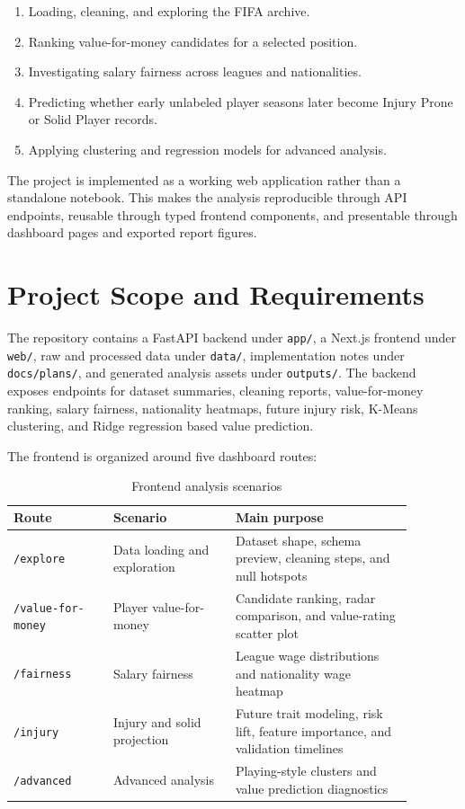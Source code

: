 \documentclass[11pt,a4paper]{article}
\begin{document}
\begin{enumerate}
  \item Loading, cleaning, and exploring the FIFA archive.
  \item Ranking value-for-money candidates for a selected position.
  \item Investigating salary fairness across leagues and nationalities.
  \item Predicting whether early unlabeled player seasons later become Injury Prone or Solid Player records.
  \item Applying clustering and regression models for advanced analysis.
\end{enumerate}

The project is implemented as a working web application rather than a standalone notebook. This makes the analysis reproducible through API endpoints, reusable through typed frontend components, and presentable through dashboard pages and exported report figures.

\section{Project Scope and Requirements}

The repository contains a FastAPI backend under \texttt{app/}, a Next.js frontend under \texttt{web/}, raw and processed data under \texttt{data/}, implementation notes under \texttt{docs/plans/}, and generated analysis assets under \texttt{outputs/}. The backend exposes endpoints for dataset summaries, cleaning reports, value-for-money ranking, salary fairness, nationality heatmaps, future injury risk, K-Means clustering, and Ridge regression based value prediction.

The frontend is organized around five dashboard routes:

\begin{table}[H]
\centering
\caption{Frontend analysis scenarios}
\begin{tabular}{p{0.22\linewidth} p{0.27\linewidth} p{0.39\linewidth}}
\toprule
Route & Scenario & Main purpose \\
\midrule
\texttt{/explore} & Data loading and exploration & Dataset shape, schema preview, cleaning steps, and null hotspots \\
\texttt{/value-for-money} & Player value-for-money & Candidate ranking, radar comparison, and value-rating scatter plot \\
\texttt{/fairness} & Salary fairness & League wage distributions and nationality wage heatmap \\
\texttt{/injury} & Injury and solid projection & Future trait modeling, risk lift, feature importance, and validation timelines \\
\texttt{/advanced} & Advanced analysis & Playing-style clusters and value prediction diagnostics \\
\bottomrule
\end{tabular}
\end{table}
\end{document}
